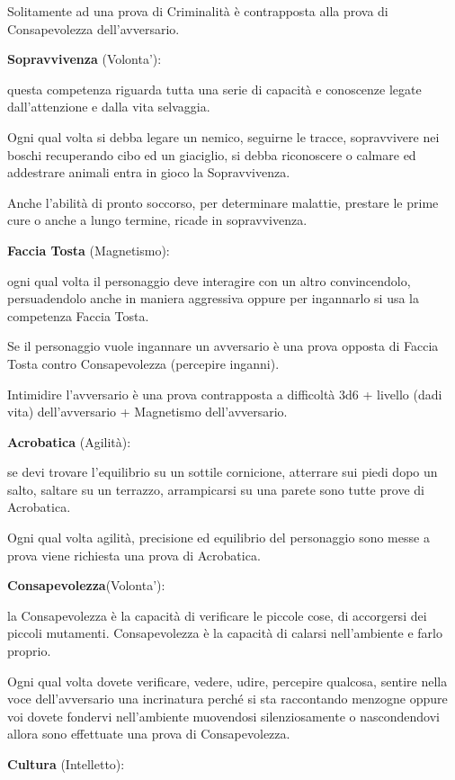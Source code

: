 \documentclass[a4paper,11pt,twoside,openany]{book}
\begin{document}
Solitamente ad una prova di Criminalità è contrapposta alla prova di Consapevolezza dell'avversario.

\textbf{Sopravvivenza} (Volonta'):

questa competenza riguarda tutta una serie di capacità e conoscenze legate dall'attenzione e dalla vita selvaggia.

Ogni qual volta si debba legare un nemico, seguirne le tracce, sopravvivere nei boschi recuperando cibo ed un giaciglio,  si debba riconoscere o calmare ed addestrare animali entra in gioco la Sopravvivenza.

Anche l'abilità di pronto soccorso, per determinare malattie, prestare le prime cure o anche a lungo termine, ricade in sopravvivenza.

\textbf{Faccia Tosta} (Magnetismo):

ogni qual volta il personaggio deve interagire con un altro convincendolo, persuadendolo anche in maniera aggressiva oppure per ingannarlo si usa la competenza Faccia Tosta.

Se il personaggio vuole ingannare un avversario è una prova opposta di Faccia Tosta contro Consapevolezza (percepire inganni).

Intimidire l'avversario è una prova contrapposta a difficoltà 3d6 + livello (dadi vita) dell'avversario + Magnetismo dell'avversario.

\textbf{Acrobatica} (Agilità):

se devi trovare l'equilibrio su un sottile cornicione, atterrare sui piedi dopo un salto, saltare su un terrazzo, arrampicarsi su una parete sono tutte prove di Acrobatica.

Ogni qual volta agilità, precisione ed equilibrio del personaggio sono messe a prova viene richiesta una prova di Acrobatica.

\textbf{Consapevolezza}(Volonta'):

la Consapevolezza è la capacità di verificare le piccole cose, di accorgersi dei piccoli mutamenti. Consapevolezza è la capacità di calarsi nell'ambiente e farlo proprio.

Ogni qual volta dovete verificare, vedere, udire, percepire qualcosa, sentire nella voce dell'avversario una incrinatura perché si sta raccontando menzogne oppure voi dovete fondervi nell'ambiente muovendosi silenziosamente o nascondendovi allora sono effettuate una prova di Consapevolezza.

\textbf{Cultura} (Intelletto):
\end{document}
